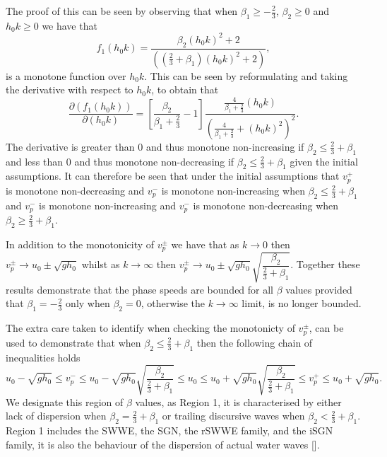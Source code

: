 \documentclass[10pt]{elsarticle}
\begin{document}
The proof of this can be seen by observing that when $\beta_1 \ge -\frac{2}{3}$, $\beta_2 \ge 0$ and $h_0 k \ge 0$ we have that 
\begin{equation*}
f_1(h_0k) = \dfrac{\beta_2 \left(h_0 k\right)^2 + 2}{\left( \left(\frac{2}{3} + \beta_1\right) \left(h_0 k\right)^2 + 2\right)},
\end{equation*}
is a monotone function over $h_0 k$. This can be seen by reformulating and taking the derivative with respect to $h_0 k$, to obtain that 
\begin{equation*}
 \frac{\partial \left(f_1(h_0k)\right)}{\partial \left(h_0 k\right)} = \left[\frac{\beta_2}{\beta_1 + \frac{2}{3}} - 1\right] \dfrac{ \frac{4}{\beta_1 + \frac{2}{3}} \left(h_0 k\right)}{\left( \frac{4}{\beta_1 + \frac{2}{3}} + \left(h_0 k\right)^2\right)^2}.
\end{equation*}
The derivative is greater than $0$ and thus monotone non-increasing if $\beta_2 \le \frac{2}{3} + \beta_1$ and less than $0$ and thus monotone non-decreasing if $\beta_2 \le \frac{2}{3} + \beta_1$  given the initial assumptions. It can therefore be seen that under the initial assumptions that $v^+_p$ is monotone non-decreasing and $v^-_p$ is monotone non-increasing when $\beta_2 \le \frac{2}{3} + \beta_1$ and $v^-_p$ is monotone non-increasing and $v^-_p$ is monotone non-decreasing when $\beta_2 \ge \frac{2}{3} + \beta_1$. 

In addition to the monotonicity of $v^\pm_p$ we have that as $k \rightarrow 0$ then $v^\pm_p \rightarrow u_0 \pm \sqrt{gh_0}$ whilst as $k \rightarrow \infty$ then $v^\pm_p \rightarrow u_0 \pm \sqrt{gh_0} \sqrt{\dfrac{\beta_2}{\frac{2}{3} + \beta_1}}$. Together these results demonstrate that the phase speeds are bounded for all $\beta$ values provided that $\beta_1 = -\frac{2}{3}$ only when $\beta_2 = 0$, otherwise the $k \rightarrow \infty$ limit, is no longer bounded. 

The extra care taken to identify when checking the monotonicty of $v^\pm_p$, can be used to demonstrate that when ${\beta_2} \le \frac{2}{3} + \beta_1$ then the following chain of inequalities holds 
\begin{equation}
u_0 -  \sqrt{gh_0} \le  v^-_p \le u_0 - \sqrt{gh_0} \sqrt{\dfrac{\beta_2}{\frac{2}{3} + \beta_1}} \le u_0 \le u_0 + \sqrt{gh_0} \sqrt{\dfrac{\beta_2}{\frac{2}{3} + \beta_1}} \le   v^+_p  \le u_0 +   \sqrt{gh_0}.
\end{equation}
We designate this region of $\beta$ values, as Region 1, it is characterised by either lack of dispersion when $\beta_2 = \frac{2}{3} + \beta_1$ or trailing discursive waves when $\beta_2 < \frac{2}{3} + \beta_1$. Region 1 includes the SWWE, the SGN, the rSWWE family, and the iSGN family, it is also the behaviour of the dispersion of actual water waves []. 
\end{document}

